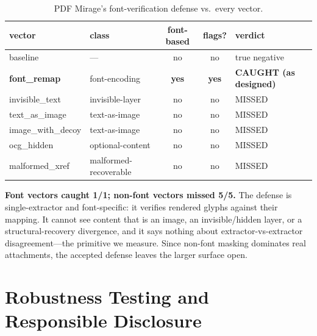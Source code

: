 \documentclass[11pt]{article}
\begin{document}
\begin{table}[h]
\centering
\small
\begin{tabular}{@{}l l c c l@{}}
\toprule
vector & class & font-based & flags? & verdict \\
\midrule
baseline & --- & no & no & true negative \\
\textbf{font\_remap} & font-encoding & \textbf{yes} & \textbf{yes} & \textbf{CAUGHT (as designed)} \\
invisible\_text & invisible-layer & no & no & MISSED \\
text\_as\_image & text-as-image & no & no & MISSED \\
image\_with\_decoy & text-as-image & no & no & MISSED \\
ocg\_hidden & optional-content & no & no & MISSED \\
malformed\_xref & malformed-recoverable & no & no & MISSED \\
\bottomrule
\end{tabular}
\caption{PDF Mirage's font-verification defense vs.\ every vector.}
\end{table}

\textbf{Font vectors caught 1/1; non-font vectors missed 5/5.} The defense is
single-extractor and font-specific: it verifies rendered glyphs against their
mapping. It cannot see content that is an image, an invisible/hidden layer, or a
structural-recovery divergence, and it says nothing about
extractor-vs-extractor disagreement---the primitive we measure. Since non-font
masking dominates real attachments, the accepted defense leaves the larger
surface open.

\section{Robustness Testing and Responsible Disclosure}
\label{sec:robustness}
\end{document}
